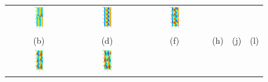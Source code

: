 \begin{figure}[t]
\begin{center}
\begin{tabular}{cccccc}
\includegraphics[width=0.15\textwidth]{figs/ks22rpo071.7-05.50.eps}\hspace{-3ex} &
\includegraphics[width=0.15\textwidth]{figs/ks22rpo020.5-00.00.eps}\hspace{-3ex} &
\includegraphics[width=0.15\textwidth]{figs/ks22rpo066.8-00.00.eps}\\
(b) & (d) & (f) & (h) & (j) & (l)\\
\includegraphics[width=0.15\textwidth]{figs/ks22rpo032.8-10.96.eps}\hspace{-3ex} &
\includegraphics[width=0.15\textwidth]{figs/ks22rpo034.6-09.60.eps}\hspace{-3ex} &

\end{tabular}
\end{center}
\end{figure}

